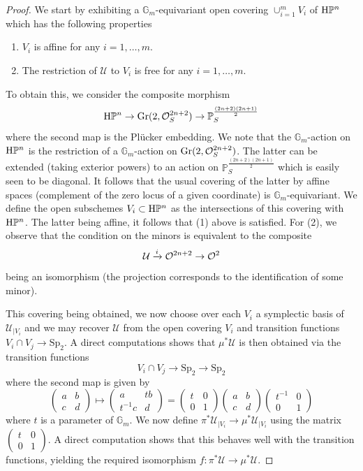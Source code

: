 \begin{num}
\begin{proof}
We start by exhibiting a $\mathbb{G}_m$-equivariant open covering $\cup_{i=1}^m V_i$ of $ \mathrm{H}\mathbb P^{n}$ which has the following properties
\begin{enumerate}
\item $V_i$ is affine for any $i=1,\ldots,m$.
\item The restriction of $\mathcal U$ to $V_i$ is free for any $i=1,\ldots,m$.
\end{enumerate} 
To obtain this, we consider the composite morphism
\[
\mathrm{H}\mathbb P^n\to \mathrm{Gr}(2,\mathcal O_S^{2n+2})\to \mathbb{P}_S^{\frac{(2n+2)(2n+1)}2}
\]
where the second map is the Pl\"ucker embedding. We note that the $\mathbb{G}_m$-action on $\mathrm{H}\mathbb P^n$ is the restriction of a $\mathbb{G}_m$-action on $\mathrm{Gr}(2,\mathcal O_S^{2n+2})$. The latter can be extended (taking exterior powers) to an action on $\mathbb{P}_S^{\frac{(2n+2)(2n+1)}2}$ which is easily seen to be diagonal. It follows that the usual covering of the latter by affine spaces (complement of the zero locus of a given coordinate) is $\mathbb{G}_m$-equivariant. We define the open subschemes $V_i\subset \mathrm{H}\mathbb P^n$ as the intersections of this covering with $\mathrm{H}\mathbb P^n$. The latter being affine, it follows that (1) above is satisfied. For (2), we observe that the condition on the minors is equivalent to the composite
\[
\mathcal{U}\xrightarrow{i}\mathcal O^{2n+2}\to \mathcal O^2
\]
being an isomorphism (the projection corresponds to the identification of some minor). 

This covering being obtained, we now choose over each $V_i$ a symplectic basis of $\mathcal U_{\vert V_i}$ and we may recover $\mathcal U$ from the open covering $V_i$ and transition functions $V_i\cap V_j\to \mathrm{Sp}_2$. A direct computations shows that $\mu^*\mathcal U$ is then obtained via the transition functions
\[
V_i\cap V_j\to \mathrm{Sp}_2\to \mathrm{Sp}_2
\]
where the second map is given by 
\[
\begin{pmatrix} a & b \\ c & d\end{pmatrix}\mapsto \begin{pmatrix} a & tb \\ t^{-1}c & d\end{pmatrix}=\begin{pmatrix} t & 0 \\ 0 & 1\end{pmatrix}\begin{pmatrix} a & b \\ c & d\end{pmatrix}\begin{pmatrix} t^{-1} & 0 \\ 0 & 1\end{pmatrix}
\]
where $t$ is a parameter of $\mathbb{G}_m$. We now define $\pi^*\mathcal U_{\vert V_i}\to \mu^*\mathcal U_{\vert V_i}$ using the matrix $\begin{pmatrix} t & 0 \\ 0 & 1\end{pmatrix}$. A direct computation shows that this behaves well with the transition functions, yielding the required isomorphism $f:\pi^*\mathcal{U}\to \mu^*\mathcal{U}$.
\end{proof}


\end{num}

